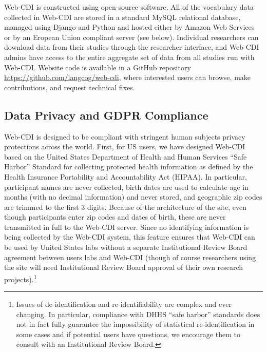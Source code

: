 \documentclass[
  english,
  ,man,floatsintext]{apa6}
\begin{document}
Web-CDI is constructed using open-source software. All of the vocabulary data collected in Web-CDI are stored in a standard MySQL relational database, managed using Django and Python and hosted either by Amazon Web Services or by an Eropean Union compliant server (see below). Individual researchers can download data from their studies through the researcher interface, and Web-CDI admins have access to the entire aggregate set of data from all studies run with Web-CDI. Website code is available in a GitHub repository \url{https://github.com/langcog/web-cdi}, where interested users can browse, make contributions, and request technical fixes.

\hypertarget{data-privacy-and-gdpr-compliance}{%
\subsection{Data Privacy and GDPR Compliance}\label{data-privacy-and-gdpr-compliance}}

Web-CDI is designed to be compliant with stringent human subjects privacy protections across the world. First, for US users, we have designed Web-CDI based on the United States Department of Health and Human Services \enquote{Safe Harbor} Standard for collecting protected health information as defined by the Health Insurance Portability and Accountability Act (HIPAA). In particular, participant names are never collected, birth dates are used to calculate age in months (with no decimal information) and never stored, and geographic zip codes are trimmed to the first 3 digits. Because of the architecture of the site, even though participants enter zip codes and dates of birth, these are never transmitted in full to the Web-CDI server. Since no identifying information is being collected by the Web-CDI system, this feature ensures that Web-CDI can be used by United States labs without a separate Institutional Review Board agreement between users labs and Web-CDI (though of course researchers using the site will need Institutional Review Board approval of their own research projects).\footnote{Issues of de-identification and re-identifiability are complex and ever changing. In particular, compliance with DHHS \enquote{safe harbor} standards does not in fact fully guarantee the impossibility of statistical re-identification in some cases and if potential users have questions, we encourage them to consult with an Institutional Review Board.}
\end{document}
